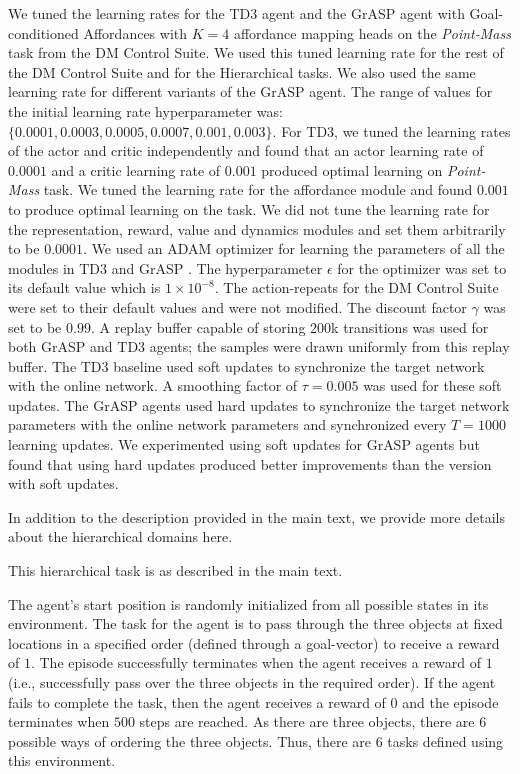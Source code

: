 \documentclass[nohyperref]{article}
\theoremstyle{plain}
\theoremstyle{definition}
\theoremstyle{remark}
\newcommand{\grasp}{{G}r{ASP} }
\begin{document}
 We tuned the learning rates for the TD3 agent and the \grasp agent with Goal-conditioned Affordances with $K=4$ affordance mapping heads on the \emph{Point-Mass} task from the DM Control Suite. We used this tuned learning rate for the rest of the DM Control Suite and for the Hierarchical tasks. We also used the same learning rate for different variants of the \grasp agent. The range of values for the initial learning rate hyperparameter was: $\{ 0.0001, 0.0003, 0.0005, 0.0007, 0.001, 0.003 \}$. For TD3, we tuned the learning rates of the actor and critic independently and found that an actor learning rate of $0.0001$ and a critic learning rate of $0.001$ produced optimal learning on \emph{Point-Mass} task. We tuned the learning rate for the affordance module and found $0.001$ to produce optimal learning on the task. We did not tune the learning rate for the representation, reward, value and dynamics modules and set them arbitrarily to be $0.0001$. We used an ADAM optimizer for learning the parameters of all the modules in TD3 and \grasp. The hyperparameter $\epsilon$ for the optimizer was set to its default value which is $1 \times 10^{-8}$. The action-repeats for the DM Control Suite were set to their default values and were not modified. The discount factor $\gamma$ was set to be $0.99$. A replay buffer capable of storing $200$k transitions was used for both \grasp and TD3 agents; the samples were drawn uniformly from this replay buffer. The TD3 baseline used soft updates to synchronize the target network with the online network. A smoothing factor of $\tau=0.005$ was used for these soft updates. The \grasp agents used hard updates to synchronize the target network parameters with the online network parameters and synchronized every $T=1000$ learning updates. We experimented using soft updates for \grasp agents but found that using hard updates produced better improvements than the version with  soft updates.

In addition to the description provided in the main text, we provide more details about the hierarchical domains here.

 This hierarchical task is as described in the main text.

 The agent's start position is randomly initialized from all possible states in its environment. The task for the agent is to pass through the three objects at fixed locations in a specified order (defined through a goal-vector) to receive a reward of $1$. The episode successfully terminates when the agent receives a reward of $1$ (i.e., successfully pass over the three objects in the required order). If the agent fails to complete the task, then the agent receives a reward of $0$ and the episode terminates when $500$ steps are reached. As there are three objects, there are $6$ possible ways of ordering the three objects. Thus, there are $6$ tasks defined using this environment.
\end{document}
